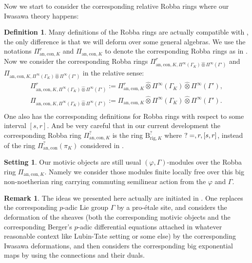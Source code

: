 \documentclass[12pt]{amsart}
\theoremstyle{definition}
\newtheorem{definition}[theorem]{Definition}
\newtheorem{remark}[theorem]{Remark}
\numberwithin{equation}{section}
\newtheorem{setting}[theorem]{Setting}
\begin{document}
\indent Now we start to consider the corresponding relative Robba rings where our Iwasawa theory happens:


\begin{definition}
Many definitions of the Robba rings are actually compatible with \cite{Nakamura1}, the only difference is that we will deform over some general algebras. We use the notations $\Pi^r_{\mathrm{an,con},K}$ and $\Pi_{\mathrm{an,con},K}$ to denote the corresponding Robba rings as in \cite[Section 2.1]{Nakamura1}. Now we consider the corresponding Robba rings $\Pi^r_{\mathrm{an,con},K,\Pi^\infty(\Gamma_K)\widehat{\otimes}\Pi^\infty(\Gamma')}$ and $\Pi_{\mathrm{an,con},K,\Pi^\infty(\Gamma_K)\widehat{\otimes}\Pi^\infty(\Gamma')}$ in the relative sense:
\begin{align}
\Pi^r_{\mathrm{an,con},K,\Pi^\infty(\Gamma_K)\widehat{\otimes}\Pi^\infty(\Gamma')}:=\Pi^r_{\mathrm{an,con},K}\widehat{\otimes}\Pi^\infty(\Gamma_K)\widehat{\otimes}\Pi^\infty(\Gamma'),\\
\Pi_{\mathrm{an,con},K,\Pi^\infty(\Gamma_K)\widehat{\otimes}\Pi^\infty(\Gamma')}:=\Pi_{\mathrm{an,con},K}\widehat{\otimes}\Pi^\infty(\Gamma_K)\widehat{\otimes}\Pi^\infty(\Gamma').\\	
\end{align}
One also has the corresponding definitions for Robba rings with respect to some interval $[s,r]$. And be very careful that in our current development the corresponding Robba ring $\Pi^?_{\mathrm{an,con},K}$ is the ring $\mathrm{B}^?_{\mathrm{rig},K}$ where $?=\empty,r,[s,r]$, instead of the ring $\Pi^?_{\mathrm{an,con}}(\pi_K)$ considered in \cite[Definition 2.2.2]{KPX}.	
\end{definition}





\begin{setting}
Our motivic objects are still usual $(\varphi,\Gamma)$-modules over the Robba ring $\Pi_{\mathrm{an,con},K}$. Namely we consider those modules finite locally free over this big non-noetherian ring carrying commuting semilinear action from the $\varphi$ and $\Gamma$. 	
\end{setting}




\begin{remark}
The ideas we presented here actually are initiated in \cite{KP}. One replaces the corresponding $p$-adic Lie group $\Gamma$ by a pro-\'etale site, and considers the deformation of the sheaves (both the corresponding motivic objects and the corresponding Berger's $p$-adic differential equations attached in whatever reasonable context like Lubin-Tate setting or some else) by the corresponding Iwasawa deformations, and then considers the corresponding big exponential maps by using the connections and their duals.	
\end{remark}
\end{document}
